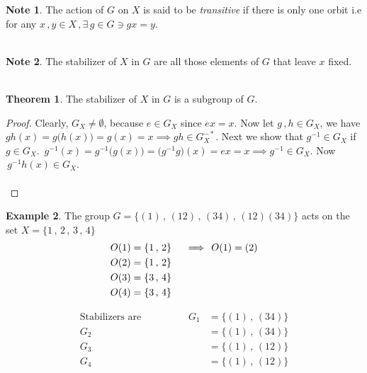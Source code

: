 \documentclass[11pt,a4paper]{article}
\theoremstyle{definition}
\newtheorem{thm}{Theorem}[subsection]
\newtheorem{exa}[thm]{Example}
\newtheorem*{note}{Note}
\begin{document}
\begin{note}
The action of $G$ on $X$ is said to be \textit{transitive} if there is only one orbit i.e for any $x\, , y\in X\, , \exists\, g\in G\ni gx  = y$.\\\\
\end{note}



\begin{note}
The stabilizer of $X$ in $G$ are all those elements of $G$ that leave $x$ fixed.\\\\
\end{note}



\begin{thm}
The stabilizer of $X$ in $G$ is a subgroup of $G$.\\
\end{thm}


\begin{proof}
Clearly, $G_X \neq \emptyset$, because $e\in G_X$ since $ex = x$. Now let $g\, , h\in G_X$, we have\\ $gh(x) = g\big(h(x)\big) = g(x) = x \implies gh \in G_X^{-*}$. Next we show that $g^{-1}\in G_X$ if $g\in G_X$. $\, g^{-1}(x)  = g^{-1}\big(g(x)\big) = \big(g^{-1}g\big)(x) = ex = x\implies g^{-1}\in G_X$. Now $\, g^{-1}h(x) \in G_X$.\\\\
\end{proof}




\begin{exa}
The group $G= \{(1)\, , \, (12)\,, \, (34)\, ,\, (12)(34)\}$ acts on the set $X = \{1\, ,\, 2\, ,\, 3\, , \, 4\}$
\begin{align*}
O(1) & = \{1\,,\, 2\} \hspace{0.4cm}\implies \, O(1) = (2)\\
O(2) & = \{1\, , \,2\}\\
O(3) & = \{3\, , \, 4\}\\
O(4) & = \{3\, , \, 4\}
\end{align*}


\begin{align*}
\text{Stabilizers are}\hspace{2cm} G_1 & = \{(1)\, , \, (34)\}\\
G_2 & = \{(1)\, , \, (34)\}\\
G_3 & = \{(1)\, , \, (12)\}\\
G_4 & = \{(1)\, , \, (12)\}\\\\
\end{align*}
\end{exa}
\end{document}
